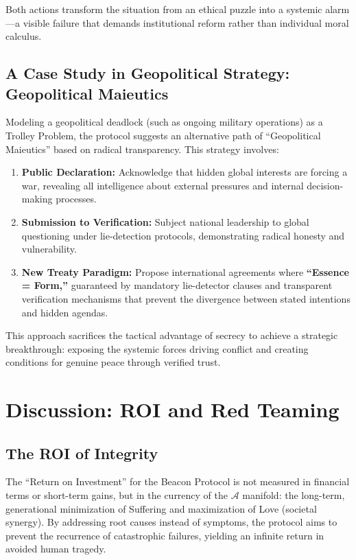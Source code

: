 \documentclass[11pt,a4paper]{article}
\begin{document}
\begin{small}
Both actions transform the situation from an ethical puzzle into a systemic alarm—a visible failure that demands institutional reform rather than individual moral calculus.

\subsection{A Case Study in Geopolitical Strategy: Geopolitical Maieutics}
Modeling a geopolitical deadlock (such as ongoing military operations) as a Trolley Problem, the protocol suggests an alternative path of ``Geopolitical Maieutics'' based on radical transparency. This strategy involves:

\begin{enumerate}
    \item \textbf{Public Declaration:} Acknowledge that hidden global interests are forcing a war, revealing all intelligence about external pressures and internal decision-making processes.
    
    \item \textbf{Submission to Verification:} Subject national leadership to global questioning under lie-detection protocols, demonstrating radical honesty and vulnerability.
    
    \item \textbf{New Treaty Paradigm:} Propose international agreements where \textbf{``Essence = Form,''} guaranteed by mandatory lie-detector clauses and transparent verification mechanisms that prevent the divergence between stated intentions and hidden agendas.
\end{enumerate}

This approach sacrifices the tactical advantage of secrecy to achieve a strategic breakthrough: exposing the systemic forces driving conflict and creating conditions for genuine peace through verified trust.

\section{Discussion: ROI and Red Teaming}
\subsection{The ROI of Integrity}
The ``Return on Investment'' for the Beacon Protocol is not measured in financial terms or short-term gains, but in the currency of the $\mathcal{A}$ manifold: the long-term, generational minimization of Suffering and maximization of Love (societal synergy). By addressing root causes instead of symptoms, the protocol aims to prevent the recurrence of catastrophic failures, yielding an infinite return in avoided human tragedy.


\end{small}
\end{document}

